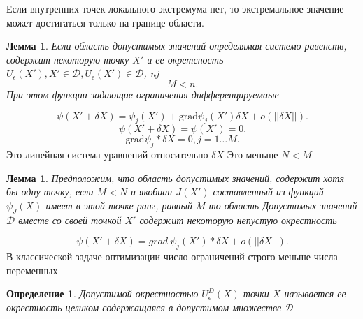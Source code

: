 \documentclass[14pt]{extarticle}
\newtheorem{definition}{Определение}
\newtheorem{lemma}[theorem]{Лемма}
\begin{document}
Если внутренних точек локального экстремума нет, то экстремальное
значение может достигаться только на границе области.
\begin{lemma}
	Если область допустимых 
	значений определямая системо равенств, содержит
	некоторую точку $X'$ и ее окретсность  $U_{\epsilon}(X'),X'\in \mathcal{D}, U_{\epsilon}(X') \in \mathcal{D}$, nj
	\[
	M < n
	.\] 
	При этом функции задающие ограничения дифференцируемаые
\end{lemma}
\[
	\psi(X' + \delta X) = \psi_{j} (X') + \text{grad} \psi_{j}(X') \delta X + o(||\delta X||)
.\] 
\[
\psi(X' + \delta X) = \psi(X') = 0
.\] 
\[
	\text{grad} \psi_{j} * \delta X = 0, j = 1 \dots M
.\] 
Это линейная система уравнений относительно $\delta X$ 
Это меньще $N < M$
\begin{lemma}
	Предположим, что область допустимых значений, содержит
	хотя бы одну точку, если $M < N$ и якобиан  $J(X')$ 
	составленный из функций  $\psi_{J}(X)$ имеет  в этой точке 
	ранг, равный $M$ то область Допустимых значений 
	 $\mathcal{D}$ вместе со своей точкой $X'$ содержит некоторую 
	 непустую окрестность
\end{lemma}
\[
	\psi(X' + \delta X) = grad~\psi_{j}(X') * \delta X + o(||\delta X||)
.\] 
В классической задаче оптимизации число ограничений строго меньше
числа переменных
\begin{definition}
	Допустимой окрестностью $U_{\epsilon}^{D}(X)$ 
	точки $X$ называется ее окрестность целиком содержащаяся в допустимом множестве
	 $\mathcal{D}$
\end{definition}
\end{document}
